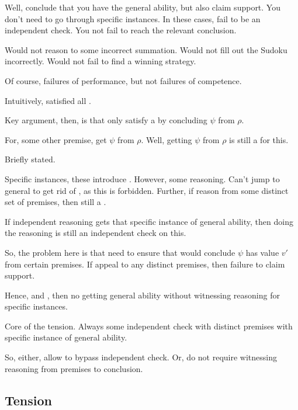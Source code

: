 \begin{note}
  Well, conclude that you have the general ability, but also claim support.
  You don't need to go through specific instances.
  In these cases, fail to be an independent check.
  You not fail to reach the relevant conclusion.

  Would not reason to some incorrect summation.
  Would not fill out the Sudoku incorrectly.
  Would not fail to find a winning strategy.

  Of course, failures of performance, but not failures of competence.

  Intuitively, satisfied all .
\end{note}


\begin{note}
  Key argument, then, is that only satisfy a \requ{} by concluding \(\psi\) from \(\rho\).

  For, some other premise, get \(\psi\) from \(\rho\).
  Well, getting \(\psi\) from \(\rho\) is still a \requ{} for this.
\end{note}

\begin{note}
  Briefly stated.

  Specific instances, these introduce \requ{}.
  However, some reasoning.
  Can't jump to general to get rid of \requ{}, as this is forbidden.
  Further, if reason from some distinct set of premises, then still a \requ{}.

  If independent reasoning gets that specific instance of general ability, then doing the reasoning is still an independent check on this.

  So, the problem here is that need to ensure that would conclude \(\psi\) has value \(v'\) from certain premises.
  If appeal to any distinct premises, then failure to claim support.

  Hence, \ESU{} and \ideaCS{}, then no getting general ability without witnessing reasoning for specific instances.

  Core of the tension.
  Always some independent check with distinct premises with specific instance of general ability.

  So, either, allow to bypass independent check.
  Or, do not require witnessing reasoning from premises to conclusion.
\end{note}

\subsection{Tension}
\label{sec:overview:tension:subsection}



